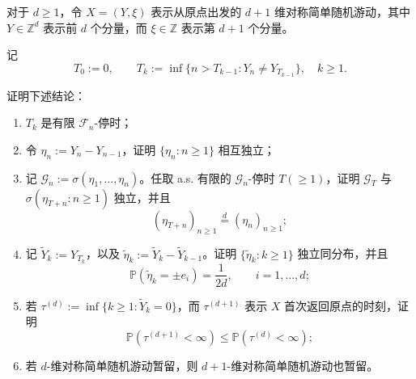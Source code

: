 \documentclass{ctexart}
\newif\ifpreface
\begin{document}
\large
\setlength{\baselineskip}{1.2em}
\ifpreface

\newgeometry{left=2cm,right=2cm,top=2cm,bottom=2cm}
\else
{}
\maketitle
\fi
\begin{problem}\label{pro:1.0.8}
  对于 \(d\ge1\)，令 \(X=(Y,\xi)\) 表示从原点出发的 \(d+1\) 维对称简单随机游动，其中
  \(Y\in\mathbb Z^d\) 表示前 \(d\) 个分量，而 \(\xi\in\mathbb Z\) 表示第 \(d+1\) 个分量。

  记
  \[
    T_0:=0,\qquad
    T_k:=\inf\{n>T_{k-1}:Y_n\neq Y_{T_{k-1}}\},\quad k\ge1.
  \]

  证明下述结论：
  \begin{enumerate}
    \item \(T_k\) 是有限 \(\mathcal F_n\)-停时；
    \item 令 \(\eta_n:=Y_n-Y_{n-1}\)，证明 \(\{\eta_n:n\ge1\}\) 相互独立；
    \item 记 \(\mathcal G_n:=\sigma(\eta_1,\dots,\eta_n)\)。任取 a.s. 有限的 \(\mathcal G_n\)-停时 \(T(\ge1)\)，证明 \(\mathcal G_T\) 与 \(\sigma(\eta_{T+n}:n\ge1)\) 独立，并且
      \[
        (\eta_{T+n})_{n\ge1}\overset d=(\eta_n)_{n\ge1};
      \]
    \item 记 \(\widetilde Y_k:=Y_{T_k}\)，以及 \(\widetilde\eta_k:=\widetilde Y_k-\widetilde Y_{k-1}\)。证明 \(\{\widetilde\eta_k:k\ge1\}\) 独立同分布，并且
      \[
        \mathbb{P}(\widetilde\eta_k=\pm e_i)=\frac1{2d},\qquad i=1,\dots,d;
      \]
    \item 若 \(\tau^{(d)}:=\inf\{k\ge1:\widetilde Y_k=0\}\)，而 \(\tau^{(d+1)}\) 表示 \(X\) 首次返回原点的时刻，证明
      \[
        \mathbb{P}(\tau^{(d+1)}<\infty)\le \mathbb{P}(\tau^{(d)}<\infty);
      \]
    \item 若 \(d\)-维对称简单随机游动暂留，则 \(d+1\)-维对称简单随机游动也暂留。
  \end{enumerate}
\end{problem}
\end{document}
